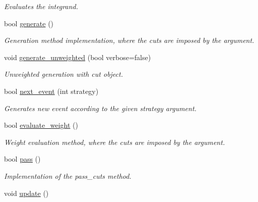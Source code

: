 \begin{DoxyCompactItemize}
\begin{DoxyCompactList}\small\item\em Evaluates the integrand. \end{DoxyCompactList}\item 
bool \hyperlink{a00436_a17ee544f823a680a9ab5966faf42e96a}{generate} ()
\begin{DoxyCompactList}\small\item\em Generation method implementation, where the cuts are imposed by the argument. \end{DoxyCompactList}\item 
\hypertarget{a00436_a2c8f6f384c66357a6878777ba5c9ea5c}{}void \hyperlink{a00436_a2c8f6f384c66357a6878777ba5c9ea5c}{generate\+\_\+unweighted} (bool verbose=false)\label{a00436_a2c8f6f384c66357a6878777ba5c9ea5c}

\begin{DoxyCompactList}\small\item\em Unweighted generation with cut object. \end{DoxyCompactList}\item 
\hypertarget{a00436_a5ca6db9f621c1c2fe4d579248df4fc32}{}bool \hyperlink{a00436_a5ca6db9f621c1c2fe4d579248df4fc32}{next\+\_\+event} (int strategy)\label{a00436_a5ca6db9f621c1c2fe4d579248df4fc32}

\begin{DoxyCompactList}\small\item\em Generates new event according to the given strategy argument. \end{DoxyCompactList}\item 
\hypertarget{a00436_a7b77349cc95414609dd0b373a77f0c7b}{}bool \hyperlink{a00436_a7b77349cc95414609dd0b373a77f0c7b}{evaluate\+\_\+weight} ()\label{a00436_a7b77349cc95414609dd0b373a77f0c7b}

\begin{DoxyCompactList}\small\item\em Weight evaluation method, where the cuts are imposed by the argument. \end{DoxyCompactList}\item 
\hypertarget{a00436_ac54c8dbf283d35111aee206ce1c1113e}{}bool \hyperlink{a00436_ac54c8dbf283d35111aee206ce1c1113e}{pass} ()\label{a00436_ac54c8dbf283d35111aee206ce1c1113e}

\begin{DoxyCompactList}\small\item\em Implementation of the pass\+\_\+cuts method. \end{DoxyCompactList}\item 
\hypertarget{a00436_a2bfb0915abfd67d74bc7add45269d3ac}{}void \hyperlink{a00436_a2bfb0915abfd67d74bc7add45269d3ac}{update} ()\label{a00436_a2bfb0915abfd67d74bc7add45269d3ac}


\end{DoxyCompactItemize}
